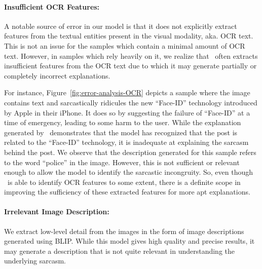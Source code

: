 \paragraph{Insufficient OCR Features:} A notable source of error in our model is that it does not explicitly extract features from the textual entities present in the visual modality, aka. OCR text. This is not an issue for the samples which contain a minimal amount of OCR text. However, in samples which rely heavily on it, we realize that \model\ often extracts insufficient features from the OCR text due to which it may generate partially or completely incorrect explanations.

For instance, Figure~\ref{fig:error-analysis-OCR} depicts a sample where the image contains text and sarcastically ridicules the new ``Face-ID'' technology introduced by Apple in their iPhone. It does so by suggesting the failure of ``Face-ID'' at a time of emergency, leading to some harm to the user. While the explanation generated by \model\ demonstrates that the model has recognized that the post is related to the ``Face-ID'' technology, it is inadequate at explaining the sarcasm behind the post. We observe that the description generated for this sample refers to the word ``police'' in the image. However, this is not sufficient or relevant enough to allow the model to identify the sarcastic incongruity. 
So, even though \model\ is able to identify OCR features to some extent, there is a definite scope in improving the sufficiency of these extracted features for more apt explanations.  





\paragraph{Irrelevant Image Description:} We extract low-level detail from the images in the form of image descriptions generated using BLIP. While this model gives high quality and precise results, it may generate a description that is not quite relevant in understanding the underlying sarcasm. 

